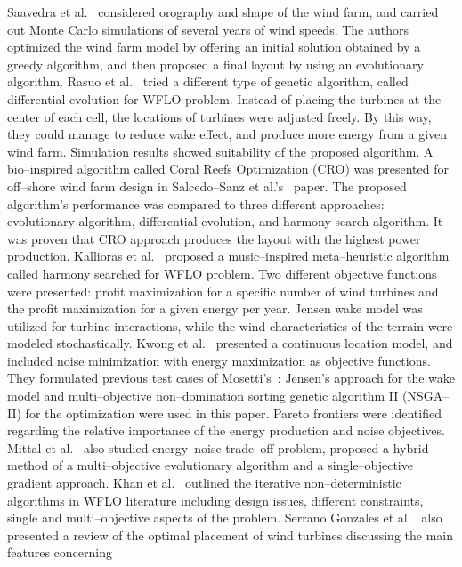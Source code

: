 \documentclass[]{iptconf}
\begin{document}
Saavedra et al.~\cite{Saavedra2011} considered orography and shape of the wind farm, and carried
out Monte Carlo simulations of several years of wind speeds. The authors optimized
the wind farm model by offering an initial solution obtained by a greedy algorithm,
and then proposed a final layout by using an evolutionary algorithm. Rasuo et al.~\cite{Rasuo2010} 
tried a different type of genetic algorithm, called differential evolution for
WFLO problem. Instead of placing the turbines at the center of each cell, the
locations of turbines were adjusted freely. By this way, they could manage to reduce
wake effect, and produce more energy from a given wind farm. Simulation results
showed suitability of the proposed algorithm. A bio--inspired algorithm called Coral
Reefs Optimization (CRO) was presented for off--shore wind farm design in Salcedo--Sanz 
et al.'s~\cite{Salcedo2014} paper. The proposed algorithm's performance was compared
to three different approaches: evolutionary algorithm, differential evolution, and
harmony search algorithm. It was proven that CRO approach produces the layout
with the highest power production.
Kallioras et al.~\cite{Kallioras2015} proposed a music--inspired meta--heuristic algorithm called
harmony searched for WFLO problem. Two different objective functions were
presented: profit maximization for a specific number of wind turbines and the profit
maximization for a given energy per year. Jensen wake model was utilized for
turbine interactions, while the wind characteristics of the terrain were modeled
stochastically. Kwong et al.~\cite{Kwong2012} presented a continuous location model, and
included noise minimization with energy maximization as objective functions. They
formulated previous test cases of Mosetti's~\cite{Mosetti1994}; Jensen's approach for the wake
model and multi--objective non--domination sorting genetic algorithm II (NSGA--II) for the optimization were used in this paper. 
Pareto frontiers were identified
regarding the relative importance of the energy production and noise objectives.
Mittal et al.~\cite{Mittal2016} also studied energy--noise trade--off problem, proposed a hybrid
method of a multi--objective evolutionary algorithm and a single--objective gradient
approach.
Khan et al.~\cite{Khan2013} outlined the iterative non--deterministic algorithms in WFLO
literature including design issues, different constraints, single and multi--objective
aspects of the problem. Serrano Gonzales et al.~\cite{Serrano2014} also presented a review of
the optimal placement of wind turbines discussing the main features concerning
\end{document}
